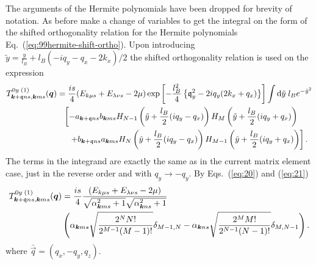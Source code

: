 The arguments of the Hermite polynomials have been dropped for brevity of notation.
As before make a change of variables to get the integral on the form of the shifted orthogonality relation for the Hermite polynomials Eq.~(\ref{eq:99hermite-shift-ortho}).
Upon introducing $\tilde{y} = \frac{y}{l_{B}} + l_B( -iq_y - q_x - 2k_x) / 2$ the shifted orthogonality relation is used on the expression
\begin{equation}
  \label{eq:25}
  \begin{split}
    T^{0y \;(1)}_{\bm{k}+\mathfrak{q}ns, \bm{k}ms} (\bm{q})
    &= \frac{i s}{4}
    (E_{k \mu s} + E_{\lambda \nu s}- 2\mu )
    \exp \left[
      -\frac{l_B^2}{4} \left\{ \mathfrak{q}_y^2- 2 i q_y (2 k_x + q_x) \right\}
    \right]
    \int \mathrm{d}\tilde{y} \; l_B
    e^{-\tilde{y}^2}\\
    &\phantom{=} \left[
      - a_{\bm{k}+\mathfrak{q} ns} b_{\bm{k} ms}
      H_{N-1} \left( \tilde{y} + \frac{l_B}{2} ( iq_y - q_x) \right)
      H_M \left( \tilde{y} + \frac{l_B}{2} (iq_y + q_x) \right)\right.\\
      &\phantom{=\big[} \left.+ b_{\bm{k}+\mathfrak{q} ns} a_{\bm{k}ms}
      H_N \left( \tilde{y} + \frac{l_B}{2} ( iq_y - q_x) \right)
      H_{M-1} \left( \tilde{y} + \frac{l_B}{2} (iq_y + q_x) \right)
    \right].
  \end{split}
\end{equation}
The terms in the integrand are exactly the same as in the current matrix element case, just in the reverse order and with $q_y \to -q_y$.
By Eqs.~(\ref{eq:20}) and (\ref{eq:21})
\begin{equation}
  \label{eq:26}
  \begin{split}
    T^{0y \;(1)}_{\bm{k}+\mathfrak{q}ns, \bm{k}ms} (\bm{q})
    &= \frac{i s}{4}
      \frac{
      (E_{k \mu s} + E_{\lambda \nu s}- 2\mu )
      }{
      \sqrt{\alpha _{\bm{k}ms}^2 +1}
      \sqrt{\alpha _{\bm{k}ns}^2 + 1}
      }\\
    &\left(
      \alpha _{\bm{k} m s}
      \sqrt{\frac{2^{N} N!}{2^{M-1} (M-1)!}} \delta_{M-1, N}
      -
      \alpha _{\bm{k} n s}
      \sqrt{\frac{2^{M} M!}{2^{N-1} (N-1)!}} \delta_{M, N-1}
      \right).
  \end{split}
\end{equation}
where $\bar{\vec{q}} = (q_x, -q_y, q_z)$.

